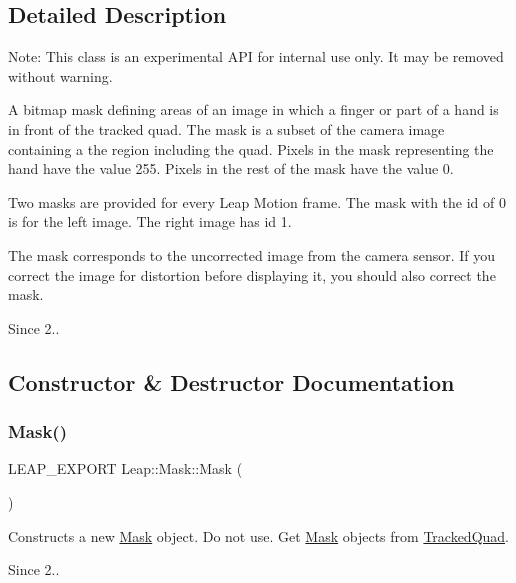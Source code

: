\subsection{Detailed Description}
Note\+: This class is an experimental A\+PI for internal use only. It may be removed without warning.

A bitmap mask defining areas of an image in which a finger or part of a hand is in front of the tracked quad. The mask is a subset of the camera image containing a the region including the quad. Pixels in the mask representing the hand have the value 255. Pixels in the rest of the mask have the value 0.

Two masks are provided for every Leap Motion frame. The mask with the id of 0 is for the left image. The right image has id 1.

The mask corresponds to the uncorrected image from the camera sensor. If you correct the image for distortion before displaying it, you should also correct the mask.

\begin{DoxySince}{Since}
2.. 
\end{DoxySince}


\subsection{Constructor \& Destructor Documentation}
\mbox{\label{class_leap_1_1_mask_acc02d69baac946a67656212f7da5f146}} 
\subsubsection{\texorpdfstring{Mask()}{Mask()}}
{\footnotesize\ttfamily L\+E\+A\+P\+\_\+\+E\+X\+P\+O\+RT Leap\+::\+Mask\+::\+Mask (\begin{DoxyParamCaption}{ }\end{DoxyParamCaption})}

Constructs a new \hyperlink{class_leap_1_1_mask}{Mask} object. Do not use. Get \hyperlink{class_leap_1_1_mask}{Mask} objects from \hyperlink{class_leap_1_1_tracked_quad}{Tracked\+Quad}. 
\begin{DoxyCodeInclude}
\end{DoxyCodeInclude}
 
\begin{DoxyCodeInclude}
\end{DoxyCodeInclude}
 \begin{DoxySince}{Since}
2.. 
\end{DoxySince}


